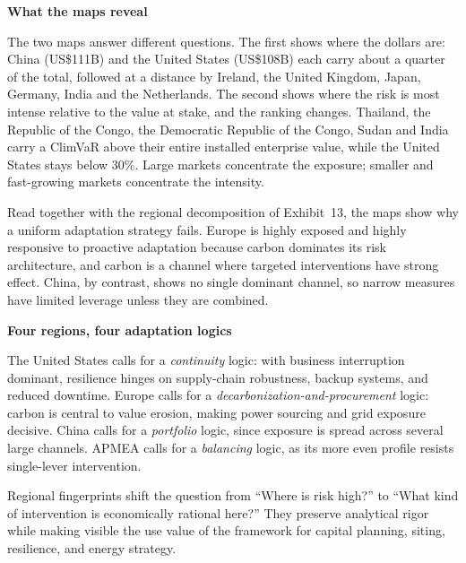 \begin{twocolbody}

{\color{SEGreen}\textbf{What the maps reveal}}

\vspace{1mm}

\noindent The two maps answer different questions. The first shows where the dollars are: China (US\$111B) and the United States (US\$108B) each carry about a quarter of the total, followed at a distance by Ireland, the United Kingdom, Japan, Germany, India and the Netherlands. The second shows where the risk is most intense relative to the value at stake, and the ranking changes. Thailand, the Republic of the Congo, the Democratic Republic of the Congo, Sudan and India carry a ClimVaR above their entire installed enterprise value, while the United States stays below 30\%. Large markets concentrate the exposure; smaller and fast-growing markets concentrate the intensity.

Read together with the regional decomposition of Exhibit~13, the maps show why a uniform adaptation strategy fails. Europe is highly exposed and highly responsive to proactive adaptation because carbon dominates its risk architecture, and carbon is a channel where targeted interventions have strong effect. China, by contrast, shows no single dominant channel, so narrow measures have limited leverage unless they are combined.

\vspace{3mm}
{\color{SEGreen}\textbf{Four regions, four adaptation logics}}

\vspace{1mm}

\noindent The United States calls for a \emph{continuity} logic: with business interruption dominant, resilience hinges on supply-chain robustness, backup systems, and reduced downtime. Europe calls for a \emph{decarbonization-and-procurement} logic: carbon is central to value erosion, making power sourcing and grid exposure decisive. China calls for a \emph{portfolio} logic, since exposure is spread across several large channels. APMEA calls for a \emph{balancing} logic, as its more even profile resists single-lever intervention.

Regional fingerprints shift the question from ``Where is risk high?'' to ``What kind of intervention is economically rational here?'' They preserve analytical rigor while making visible the use value of the framework for capital planning, siting, resilience, and energy strategy.


\end{twocolbody}

